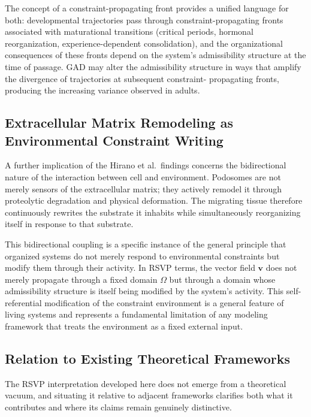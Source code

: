 \documentclass[11pt,a4paper]{article}
\theoremstyle{plain}
\theoremstyle{definition}
\begin{document}
The concept of a constraint-propagating front provides a unified language for both:
developmental trajectories pass through constraint-propagating fronts associated with
maturational transitions (critical periods, hormonal reorganization, experience-dependent
consolidation), and the organizational consequences of these fronts depend on the
system's admissibility structure at the time of passage. GAD may alter the admissibility
structure in ways that amplify the divergence of trajectories at subsequent constraint-
propagating fronts, producing the increasing variance observed in adults.

\subsection{Extracellular Matrix Remodeling as Environmental Constraint Writing}

A further implication of the Hirano et al.\ findings concerns the bidirectional nature
of the interaction between cell and environment. Podosomes are not merely sensors of
the extracellular matrix; they actively remodel it through proteolytic degradation and
physical deformation. The migrating tissue therefore continuously rewrites the substrate
it inhabits while simultaneously reorganizing itself in response to that substrate.

This bidirectional coupling is a specific instance of the general principle that
organized systems do not merely respond to environmental constraints but modify them
through their activity. In RSVP terms, the vector field $\mathbf{v}$ does not merely
propagate through a fixed domain $\Omega$ but through a domain whose admissibility
structure is itself being modified by the system's activity. This self-referential
modification of the constraint environment is a general feature of living systems
and represents a fundamental limitation of any modeling framework that treats the
environment as a fixed external input.

\subsection{Relation to Existing Theoretical Frameworks}

The RSVP interpretation developed here does not emerge from a theoretical vacuum, and
situating it relative to adjacent frameworks clarifies both what it contributes and
where its claims remain genuinely distinctive.
\end{document}
